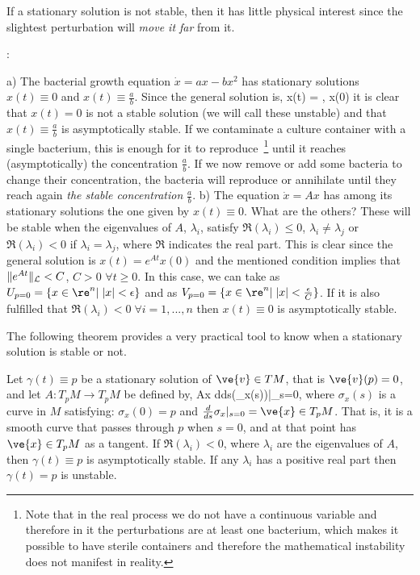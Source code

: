 If a stationary solution is not stable, then it has little physical interest since the slightest perturbation will {\sl move it far} from it.

\espa
\noi{}:

\noi
a) The bacterial growth equation $\dot x = ax -bx^2$ has stationary solutions $x(t) \equiv 0$ and $x(t) \equiv \frac ab$. Since the general solution is, 
\beq
x(t) = , x(0) 
\eeq
it is clear that $x(t)=0$ is not a stable solution (we will call these unstable) and that $x(t) \equiv \frac ab$ is asymptotically stable. If we contaminate a culture container with a single bacterium, this is enough for it to reproduce~\footnote{Note that in the real process we do not have a continuous variable and therefore in it the perturbations are at least one bacterium, which makes it possible to have sterile containers and therefore the mathematical instability does not manifest in reality.} until it reaches (asymptotically) the concentration $\frac ab$. If we now remove or add some bacteria to change their concentration, the bacteria will reproduce or annihilate until they reach again {\sl the stable concentration} $\frac ab$.
\espa
\noi
b) The equation $\dot x = A x$ has among its stationary solutions the one given by $x(t) \equiv 0$. What are the others? These will be stable when the eigenvalues of $A$, $\lambda_i$, satisfy $\Re(\lambda_i) \leq 0$, $\lambda_i \neq \lambda_j$ or $\Re(\lambda_i) <0$ if $\lambda_i=\lambda_j$, where $\Re$ indicates the real part. This is clear since the general solution is $x(t) = e^{At}x(0)$ and the mentioned condition implies that $\|e^{At}\|_{\cal L} < C$, $C >0$ $\forall t\geq 0$. In this case, we can take as $U_{p=0} = \{x \in \re^n |\;|x| < \epsilon\}$ and as $V_{p=0} = \{x \in \re^n |\;|x| < \frac{\epsilon}{C}\}$. If it is also fulfilled that $\Re(\lambda_i) < 0 \;\forall i=1,...,n$ then $x(t) \equiv 0$ is asymptotically stable.

The following theorem provides a very practical tool to know when a stationary solution is stable or not.

\bteo[Stability] 
Let $\gamma(t) \equiv p$ be a stationary solution of $\ve{v} \in TM$, that is $\ve{v}(p) = 0$, and let $A:T_pM\rightarrow T_pM $ be defined by,
\beq
Ax \equiv \frac d{ds}(\sigma_x(s))|_{s=0},
\eeq
where $\sigma_x(s)$ is a curve in $M$ satisfying: $\sigma_x(0)=p$ and $\frac d{ds}\sigma_x|_{s=0} = \ve{x} \in T_pM$. That is, it is a smooth curve that passes through $p$ when $s=0$, and at that point has $\ve{x} \in T_pM$ as a tangent. If $\Re (\lambda_i) < 0$, where $\lambda_i$ are the eigenvalues of $A$, then $\gamma(t) \equiv p$ is asymptotically stable. If any $\lambda_i$ has a positive real part then $\gamma(t)=p$ is unstable.
\eteo


